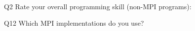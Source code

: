 \begin{description}%
\item{Q2} Rate your overall programming skill (non-MPI programs):%
\item{Q12} Which MPI implementations do you use?%
\end{description}%
